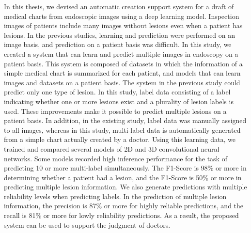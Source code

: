 In this thesis, we devised an automatic creation support system for a draft of medical charts from endoscopic images using a deep learning model.
Inspection images of patients include many images without lesions even when a patient has lesions.
In the previous studies, learning and prediction were performed on an image basis, and prediction on a patient basis was difficult.
In this study, we created a system that can learn and predict multiple images in endoscopy on a patient basis.
This system is composed of datasets in which the information of a simple medical chart is summarized for each patient, and models that can learn images and datasets on a patient basis.
The system in the previous study could predict only one type of lesion.
In this study, label data consisting of a label indicating whether one or more lesions exist and a plurality of lesion labels is used.
These improvements make it possible to predict multiple lesions on a patient basis.
In addition, in the existing study, label data was manually assigned to all images, whereas in this study, multi-label data is automatically generated from a simple chart actually created by a doctor.
Using this learning data, we trained and compared several models of 2D and 3D convolutional neural networks. 
Some models recorded high inference performance for the task of predicting 10 or more multi-label simultaneously.
The F1-Score is 98\% or more in determining whether a patient had a lesion, and the F1-Score is 50\% or more in predicting multiple lesion information.
We also generate predictions with multiple reliability levels when predicting labels.
In the prediction of multiple lesion information, the precision is 87\% or more for highly reliable predictions, and the recall is 81\% or more for lowly reliability predictions.
As a result, the proposed system can be used to support the judgment of doctors.
